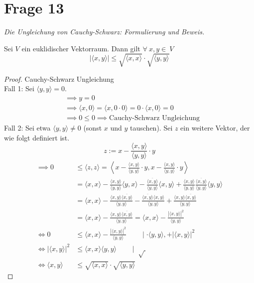 \section{Frage 13}
\textit{Die Ungleichung von Cauchy-Schwarz: Formulierung und Beweis.}
\begin{theorem}
    Sei $V$ ein euklidischer Vektorraum. Dann gilt $\forall~x,y\in~V$
    \[
    |\langle x,y \rangle|\leq \sqrt{\langle x,x\rangle}\cdot\sqrt{\langle y,y\rangle}\]
\end{theorem}
\begin{proof} Cauchy-Schwarz Ungleichung\\
    Fall 1: Sei $\langle y,y\rangle = 0$.
    \begin{align*}
        &\implies y = 0\\
        &\implies \langle x,0\rangle = \langle x, 0\cdot 0\rangle = 0\cdot \langle x, 0\rangle = 0\\
        &\implies 0 \leq 0 \implies \text{Cauchy-Schwarz Ungleichung}
    \end{align*}
    Fall 2: Sei etwa $\langle y,y\rangle\neq 0$ (sonst $x$ und $y$ tauschen). Sei $z$ ein weitere Vektor, 
    der wie folgt definiert ist.
    \[
    z := x - \frac{\langle x, y\rangle}{\langle y,y\rangle}\cdot y\]
    \begin{align*}
        \implies 0 &\leq \langle z, z\rangle = \left\langle x - \frac{\langle x, y\rangle}{\langle y,y\rangle}\cdot y, x - \frac{\langle x, y\rangle}{\langle y,y\rangle}\cdot y \right\rangle\\
        &= \langle x,x\rangle - \frac{\langle x, y\rangle}{\langle y,y\rangle}\langle y,x\rangle - \frac{\overline{\langle x,y\rangle}}{\langle y, y\rangle}\langle x,y\rangle + \frac{\langle x,y\rangle}{\langle y,y\rangle}\frac{\overline{\langle x,y\rangle}}{\langle y,y\rangle}\langle y,y\rangle\\
        &= \langle x,x\rangle - \frac{\langle x,y\rangle \overline{\langle x,y\rangle}}{\langle y,y\rangle} - \frac{\overline{\langle x,y\rangle}\langle x,y\rangle}{\langle y,y \rangle} + \frac{\langle x,y\rangle \overline{\langle x,y\rangle}}{\langle y,y\rangle}\\
        &= \langle x,x\rangle - \frac{\langle x,y\rangle \overline{\langle x,y\rangle}}{\langle y,y\rangle} = \langle x,x\rangle - \frac{|\langle x,y\rangle|^2}{\langle y,y\rangle}\\
        \Longleftrightarrow 0 &\leq \langle x,x\rangle - \frac{|\langle x,y\rangle|^2}{\langle y,y\rangle}\qquad\mid\cdot \langle y,y\rangle, +|\langle x,y\rangle|^2\\
        \Longleftrightarrow |\langle x,y\rangle|^2 &\leq \langle x, x\rangle\langle y,y\rangle\qquad\mid\sqrt[]{\ }\\
        \Longleftrightarrow \langle x,y\rangle &\leq \sqrt{\langle x, x\rangle}\cdot \sqrt{\langle y,y\rangle}
    \end{align*}
\end{proof}